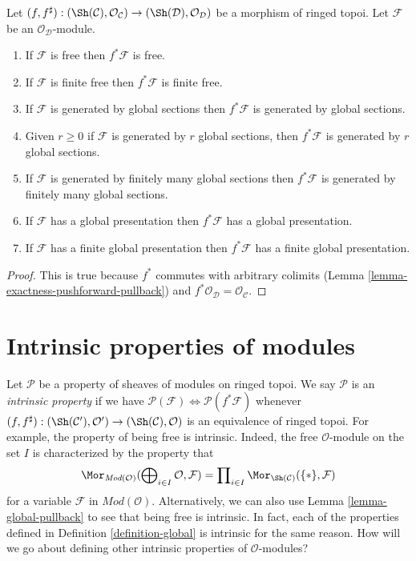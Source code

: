 \begin{lemma}
\label{lemma-global-pullback}
Let
$(f, f^\sharp) :
(\Sh(\mathcal{C}), \mathcal{O}_\mathcal{C})
\to
(\Sh(\mathcal{D}), \mathcal{O}_\mathcal{D})$
be a morphism of ringed topoi.
Let $\mathcal{F}$ be an $\mathcal{O}_\mathcal{D}$-module.
\begin{enumerate}
\item If $\mathcal{F}$ is free then $f^*\mathcal{F}$ is free.
\item If $\mathcal{F}$ is finite free then $f^*\mathcal{F}$ is finite free.
\item If $\mathcal{F}$ is generated by global sections
then $f^*\mathcal{F}$ is generated by global sections.
\item Given $r \geq 0$ if $\mathcal{F}$ is generated by $r$ global
sections, then $f^*\mathcal{F}$ is generated by $r$ global sections.
\item If $\mathcal{F}$ is generated by finitely many global sections
then $f^*\mathcal{F}$ is generated by finitely many global sections.
\item If $\mathcal{F}$ has a global presentation then
$f^*\mathcal{F}$ has a global presentation.
\item If $\mathcal{F}$ has a finite global presentation
then $f^*\mathcal{F}$ has a finite global presentation.
\end{enumerate}
\end{lemma}

\begin{proof}
This is true because $f^*$ commutes with arbitrary colimits
(Lemma \ref{lemma-exactness-pushforward-pullback})
and $f^*\mathcal{O}_\mathcal{D} = \mathcal{O}_\mathcal{C}$.
\end{proof}






\section{Intrinsic properties of modules}
\label{section-intrinsic}

\noindent
Let $\mathcal{P}$ be a property of sheaves of modules on ringed topoi.
We say $\mathcal{P}$ is an {\it intrinsic property} if we have
$\mathcal{P}(\mathcal{F}) \Leftrightarrow \mathcal{P}(f^*\mathcal{F})$
whenever $(f, f^\sharp) :
(\Sh(\mathcal{C}'), \mathcal{O}')
\to
(\Sh(\mathcal{C}), \mathcal{O})$
is an equivalence of ringed topoi.
For example, the property of being free is intrinsic. Indeed, the free
$\mathcal{O}$-module on the set $I$ is characterized by the property
that
$$
\Mor_{\textit{Mod}(\mathcal{O})}(
\bigoplus\nolimits_{i \in I} \mathcal{O},
\mathcal{F})
=
\prod\nolimits_{i \in I} \Mor_{\Sh(\mathcal{C})}(\{*\},
\mathcal{F})
$$
for a variable $\mathcal{F}$ in $\textit{Mod}(\mathcal{O})$.
Alternatively, we can also use Lemma \ref{lemma-global-pullback}
to see that being free is intrinsic. In fact, each of the properties
defined in Definition \ref{definition-global} is intrinsic for the
same reason.
How will we go about defining other intrinsic properties of
$\mathcal{O}$-modules?

